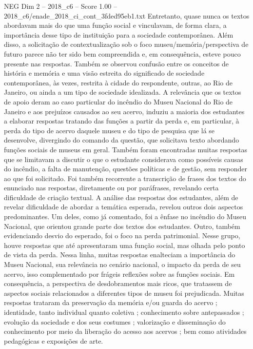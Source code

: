 \begin{textsample}{NEG Dim 2 – 2018\_c6 – Score 1.00 – 2018\_c6/enade\_2018\_ci\_cont\_3fded95eb1.txt}
Entretanto, quase nunca os textos abordavam mais do que uma função social e vinculavam, de forma clara, a importância desse tipo de instituição para a sociedade contemporânea.
Além disso, a solicitação de contextualização sob o foco museu/memória/perspectiva de futuro parece não ter sido bem compreendida e, em consequência, esteve pouco presente nas respostas.
Também se observou confusão entre os conceitos de história e memória e uma visão estreita do significado de sociedade contemporânea, às vezes, restrita à cidade do respondente, outras, ao Rio de Janeiro, ou ainda a um tipo de sociedade idealizada.
A relevância que os textos de apoio deram ao caso particular do incêndio do Museu Nacional do Rio de Janeiro e aos prejuízos causados ao seu acervo, induziu a maioria dos estudantes a elaborar respostas tratando das funções a partir da perda e, em particular, à perda do tipo de acervo daquele museu e do tipo de pesquisa que lá se desenvolve, divergindo do comando da questão, que solicitava texto abordando funções sociais de museus em geral.
Também foram encontradas muitas respostas que se limitavam a discutir o que o estudante considerava como possíveis causas do incêndio, a falta de manutenção, questões políticas e de gestão, sem responder ao que foi solicitado.
Foi também recorrente a transcrição de frases dos textos do enunciado nas respostas, diretamente ou por paráfrases, revelando certa dificuldade de criação textual.
A análise das respostas dos estudantes, além de revelar dificuldade de abordar a temática esperada, revelou outros dois aspectos predominantes.
Um deles, como já comentado, foi a ênfase no incêndio do Museu Nacional, que orientou grande parte dos textos dos estudantes.
Outro, também evidenciando desvio do esperado, foi o foco na perda patrimonial.
Nesse grupo, houve respostas que até apresentaram uma função social, mas olhada pelo ponto de vista da perda.
Nessa linha, muitas respostas enalteciam a importância do Museu Nacional, sua relevância no cenário nacional, o impacto da perda de seu acervo, isso complementado por frágeis reflexões sobre as funções sociais.
Em consequência, a perspectiva de desdobramentos mais ricos, que tratassem de aspectos sociais relacionados a diferentes tipos de museu foi prejudicada.
Muitas respostas trataram da preservação da memória e/ou guarda do acervo ; identidade, tanto individual quanto coletiva ; conhecimento sobre antepassados ; evolução da sociedade e dos seus costumes ; valorização e disseminação do conhecimento por meio da liberação do acesso aos acervos ; bem como atividades pedagógicas e exposições de arte.

\end{textsample}
